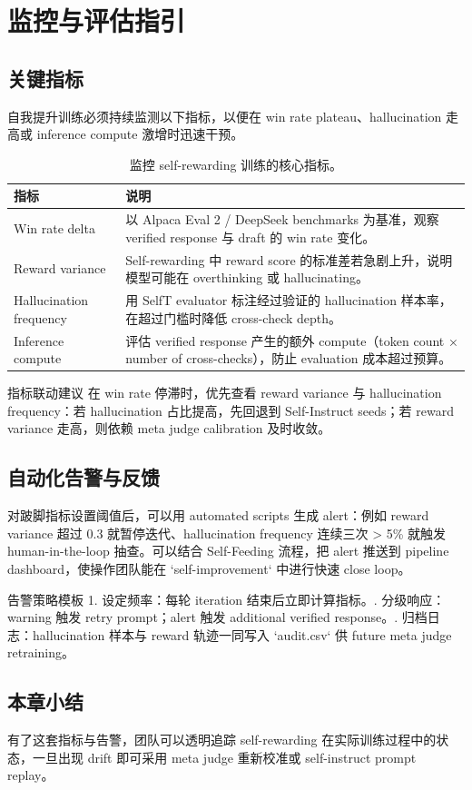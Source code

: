 \section{监控与评估指引}
\subsection{关键指标}
自我提升训练必须持续监测以下指标，以便在 win rate plateau、hallucination 走高或 inference compute 激增时迅速干预。

\begin{table}[H]
\centering
\begin{tabular}{p{5cm}p{10cm}}
\toprule
指标 & 说明 \\
\midrule
Win rate delta & 以 Alpaca Eval 2 / DeepSeek benchmarks 为基准，观察 verified response 与 draft 的 win rate 变化。 \\
Reward variance & Self-rewarding 中 reward score 的标准差若急剧上升，说明模型可能在 overthinking 或 hallucinating。 \\
Hallucination frequency & 用 SelfT evaluator 标注经过验证的 hallucination 样本率，在超过门槛时降低 cross-check depth。 \\
Inference compute & 评估 verified response 产生的额外 compute（token count × number of cross-checks），防止 evaluation 成本超过预算。 \\
\bottomrule
\end{tabular}
\caption{监控 self-rewarding 训练的核心指标。}
\end{table}

\begin{importantbox}{指标联动建议}
在 win rate 停滞时，优先查看 reward variance 与 hallucination frequency：若 hallucination 占比提高，先回退到 Self-Instruct seeds；若 reward variance 走高，则依赖 meta judge calibration 及时收敛。
\end{importantbox}

\subsection{自动化告警与反馈}
对跛脚指标设置阈值后，可以用 automated scripts 生成 alert：例如 reward variance 超过 0.3 就暂停迭代、hallucination frequency 连续三次 > 5\% 就触发 human-in-the-loop 抽查。可以结合 Self-Feeding 流程，把 alert 推送到 pipeline dashboard，使操作团队能在 `self-improvement` 中进行快速 close loop。

\begin{knowledgebox}{告警策略模板}
1. 设定频率：每轮 iteration 结束后立即计算指标。. 分级响应：warning 触发 retry prompt；alert 触发 additional verified response。. 归档日志：hallucination 样本与 reward 轨迹一同写入 `audit.csv` 供 future meta judge retraining。
\end{knowledgebox}

\subsection{本章小结}
有了这套指标与告警，团队可以透明追踪 self-rewarding 在实际训练过程中的状态，一旦出现 drift 即可采用 meta judge 重新校准或 self-instruct prompt replay。

